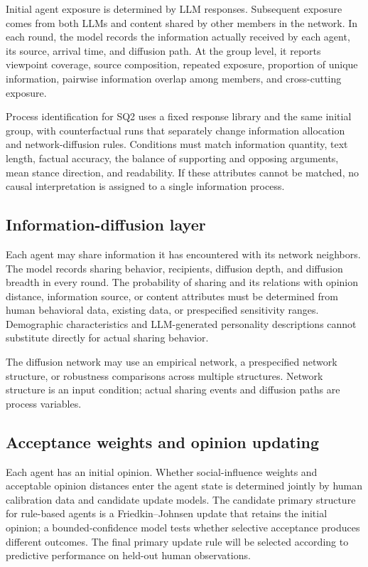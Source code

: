 \documentclass[11pt,a4paper]{article}
\begin{document}
Initial agent exposure is determined by LLM responses. Subsequent exposure comes from both LLMs and content shared by other members in the network. In each round, the model records the information actually received by each agent, its source, arrival time, and diffusion path. At the group level, it reports viewpoint coverage, source composition, repeated exposure, proportion of unique information, pairwise information overlap among members, and cross-cutting exposure.

Process identification for SQ2 uses a fixed response library and the same initial group, with counterfactual runs that separately change information allocation and network-diffusion rules. Conditions must match information quantity, text length, factual accuracy, the balance of supporting and opposing arguments, mean stance direction, and readability. If these attributes cannot be matched, no causal interpretation is assigned to a single information process.

\subsection{Information-diffusion layer}

Each agent may share information it has encountered with its network neighbors. The model records sharing behavior, recipients, diffusion depth, and diffusion breadth in every round. The probability of sharing and its relations with opinion distance, information source, or content attributes must be determined from human behavioral data, existing data, or prespecified sensitivity ranges. Demographic characteristics and LLM-generated personality descriptions cannot substitute directly for actual sharing behavior.

The diffusion network may use an empirical network, a prespecified network structure, or robustness comparisons across multiple structures. Network structure is an input condition; actual sharing events and diffusion paths are process variables.

\subsection{Acceptance weights and opinion updating}

Each agent has an initial opinion. Whether social-influence weights and acceptable opinion distances enter the agent state is determined jointly by human calibration data and candidate update models. The candidate primary structure for rule-based agents is a Friedkin--Johnsen update that retains the initial opinion; a bounded-confidence model tests whether selective acceptance produces different outcomes. The final primary update rule will be selected according to predictive performance on held-out human observations.
\end{document}
